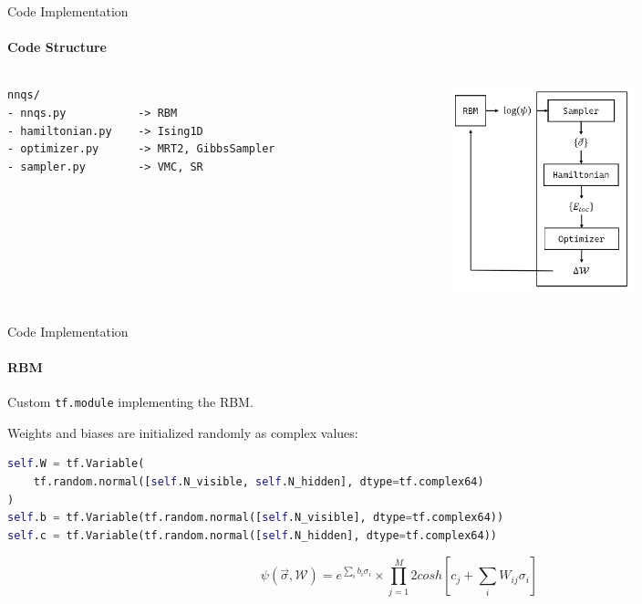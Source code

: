 \documentclass{beamer}
\begin{document}
\begin{frame}[fragile]{Code Implementation}
\framesubtitle{Code Structure}
\begin{columns}
\begin{column}{0.4\textwidth}
\begin{lstlisting}[style=kaolstplain]
nnqs/
- nnqs.py			-> RBM
- hamiltonian.py	-> Ising1D
- optimizer.py		-> MRT2, GibbsSampler
- sampler.py		-> VMC, SR
\end{lstlisting}
\end{column}
\begin{column}{0.5\textwidth}
\includegraphics[height=6cm]{images/pipeline.png}
\end{column}
\end{columns}
\end{frame}

\begin{frame}[fragile]{Code Implementation}
\framesubtitle{RBM}

Custom \lstinline[style=kaolstplain]|tf.module| implementing the RBM.
\baselineskip

Weights and biases are initialized randomly as complex values:
\begin{lstlisting}[language=Python, style=kaolstplain]
self.W = tf.Variable(
	tf.random.normal([self.N_visible, self.N_hidden], dtype=tf.complex64)
)
self.b = tf.Variable(tf.random.normal([self.N_visible], dtype=tf.complex64))
self.c = tf.Variable(tf.random.normal([self.N_hidden], dtype=tf.complex64))
\end{lstlisting}

$$\psi\left(\vec{\sigma}, \mathcal{W}\right) = e^{\sum_{i} b_i \sigma_i} \times \prod_{j=1}^{M} {2 cosh\left[c_j + \sum_{i} W_{ij} \sigma_i\right]}$$

\end{frame}
\end{document}
